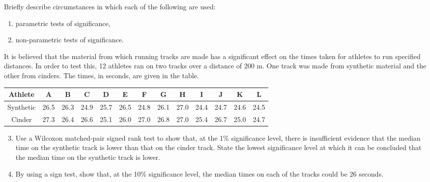 \begin{problem}
    Briefly describe circumstances in which each of the following are used:
    \begin{enumerate}
        \item parametric tests of significance,
        \item non-parametric tests of significance.
    \end{enumerate}

    It is believed that the material from which running tracks are made has a significant effect on the times taken for athletes to run specified distances. In order to test this, 12 athletes ran on two tracks over a distance of 200 m. One track was made from synthetic material and the other from cinders. The times, in seconds, are given in the table.

    \begin{table}[H]
        \centering
        \begin{tabular}{|c|c|c|c|c|c|c|c|c|c|c|c|c|}
        \hline
        Athlete & A & B & C & D & E & F & G & H & I & J & K & L \\ \hline
        Synthetic & 26.5 & 26.3 & 24.9 & 25.7 & 26.5 & 24.8 & 26.1 & 27.0 & 24.4 & 24.7 & 24.6 & 24.5 \\ \hline
        Cinder & 27.3 & 26.4 & 26.6 & 25.1 & 26.0 & 27.0 & 26.8 & 27.0 & 25.4 & 26.7 & 25.0 & 24.7 \\ \hline
        \end{tabular}
    \end{table}

    \begin{enumerate}
        \setcounter{enumi}{2}
        \item Use a Wilcoxon matched-pair signed rank test to show that, at the 1\% significance level, there is insufficient evidence that the median time on the synthetic track is lower than that on the cinder track. State the lowest significance level at which it can be concluded that the median time on the synthetic track is lower.
        \item By using a sign test, show that, at the 10\% significance level, the median times on each of the tracks could be 26 seconds.
    \end{enumerate}
\end{problem}
